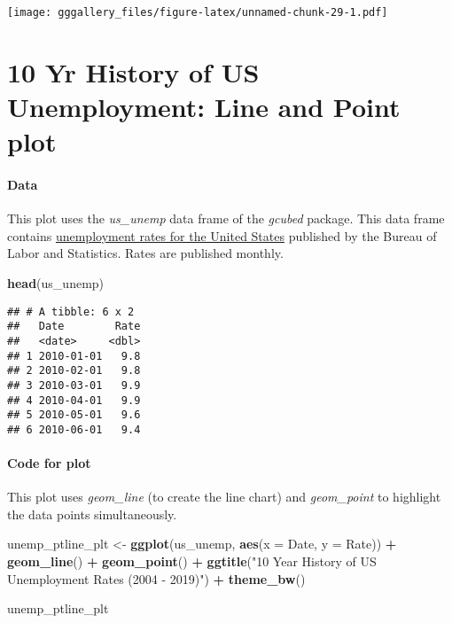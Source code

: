 \documentclass[]{book}
\newenvironment{Shaded}{\begin{snugshade}}{\end{snugshade}}
\newcommand{\DataTypeTok}[1]{\textcolor[rgb]{0.13,0.29,0.53}{#1}}
\newcommand{\KeywordTok}[1]{\textcolor[rgb]{0.13,0.29,0.53}{\textbf{#1}}}
\newcommand{\NormalTok}[1]{#1}
\newcommand{\OperatorTok}[1]{\textcolor[rgb]{0.81,0.36,0.00}{\textbf{#1}}}
\newcommand{\StringTok}[1]{\textcolor[rgb]{0.31,0.60,0.02}{#1}}
\begin{document}
\texttt{[image: gggallery\_files/figure-latex/unnamed-chunk-29-1.pdf]}

\hypertarget{unempp}{%
\chapter*{10 Yr History of US Unemployment: Line and Point plot}\label{unempp}}

\hypertarget{unemppdata}{%
\subsubsection*{Data}\label{unemppdata}}

This plot uses the \emph{us\_unemp} data frame of the \emph{gcubed} package. This data frame contains \href{https://data.bls.gov/timeseries/LNS14000000}{unemployment rates for the United States} published by the Bureau of Labor and Statistics. Rates are published monthly.

\begin{Shaded}
\begin{Highlighting}[]
\KeywordTok{head}\NormalTok{(us_unemp)}
\end{Highlighting}
\end{Shaded}

\begin{verbatim}
## # A tibble: 6 x 2
##   Date        Rate
##   <date>     <dbl>
## 1 2010-01-01   9.8
## 2 2010-02-01   9.8
## 3 2010-03-01   9.9
## 4 2010-04-01   9.9
## 5 2010-05-01   9.6
## 6 2010-06-01   9.4
\end{verbatim}

\hypertarget{unemppcode}{%
\subsubsection*{Code for plot}\label{unemppcode}}

This plot uses \emph{geom\_line} (to create the line chart) and \emph{geom\_point} to highlight the data
points simultaneously.

\begin{Shaded}
\begin{Highlighting}[]
\NormalTok{unemp_ptline_plt <-}\StringTok{ }\KeywordTok{ggplot}\NormalTok{(us_unemp, }\KeywordTok{aes}\NormalTok{(}\DataTypeTok{x =}\NormalTok{ Date, }\DataTypeTok{y =}\NormalTok{ Rate)) }\OperatorTok{+}\StringTok{ }
\StringTok{  }\KeywordTok{geom_line}\NormalTok{() }\OperatorTok{+}\StringTok{ }\KeywordTok{geom_point}\NormalTok{() }\OperatorTok{+}
\StringTok{  }\KeywordTok{ggtitle}\NormalTok{(}\StringTok{"10 Year History of US Unemployment Rates (2004 - 2019)"}\NormalTok{)  }\OperatorTok{+}
\StringTok{  }\KeywordTok{theme_bw}\NormalTok{()}

\NormalTok{unemp_ptline_plt}
\end{Highlighting}
\end{Shaded}
\end{document}
